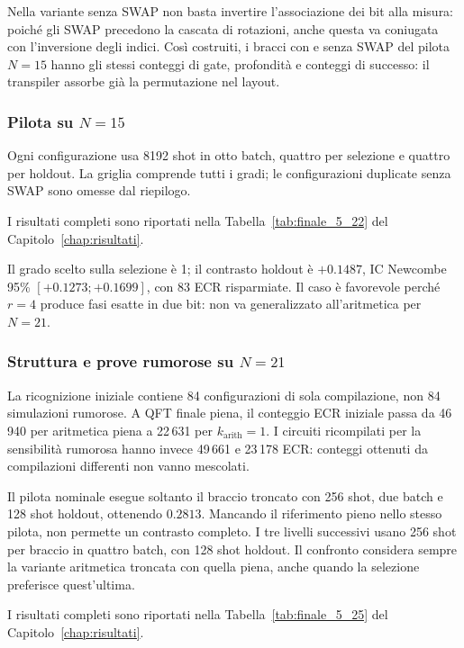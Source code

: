 \begin{onehalfspace}
Nella variante senza SWAP non basta invertire l'associazione dei bit alla
misura: poiché gli SWAP precedono la cascata di rotazioni, anche questa va
coniugata con l'inversione degli indici. Così costruiti, i bracci con e senza
SWAP del pilota $N=15$ hanno gli stessi conteggi di gate, profondità e
conteggi di successo: il transpiler assorbe già la permutazione nel layout.

\subsubsection{Pilota su \texorpdfstring{$N=15$}{N=15}}

Ogni configurazione usa 8192 shot in otto batch, quattro per selezione
e quattro per holdout. La griglia comprende tutti i gradi; le configurazioni
duplicate senza SWAP sono omesse dal riepilogo.

I risultati completi sono riportati nella Tabella~\ref{tab:finale_5_22} del Capitolo~\ref{chap:risultati}.

Il grado scelto sulla selezione è 1; il contrasto holdout è $+0.1487$,
IC Newcombe 95\% $[+0.1273;+0.1699]$, con 83 ECR risparmiate.
Il caso è favorevole perché $r=4$ produce fasi esatte in due bit:
non va generalizzato all'aritmetica per $N=21$.

\subsubsection{Struttura e prove rumorose su \texorpdfstring{$N=21$}{N=21}}

La ricognizione iniziale contiene 84 configurazioni di sola compilazione,
non 84 simulazioni rumorose. A QFT finale piena, il conteggio ECR iniziale
passa da 46\,940 per aritmetica piena a 22\,631 per
$k_{\mathrm{arith}}=1$. I circuiti ricompilati per la sensibilità
rumorosa hanno invece 49\,661 e 23\,178 ECR: conteggi ottenuti da
compilazioni differenti non vanno mescolati.

Il pilota nominale esegue soltanto il braccio troncato con 256 shot,
due batch e 128 shot holdout, ottenendo $0.2813$. Mancando il riferimento
pieno nello stesso pilota, non permette un contrasto completo.
I tre livelli successivi usano 256 shot per braccio in quattro batch,
con 128 shot holdout. Il confronto considera sempre la variante
aritmetica troncata con quella piena, anche quando la selezione
preferisce quest'ultima.

I risultati completi sono riportati nella Tabella~\ref{tab:finale_5_25} del Capitolo~\ref{chap:risultati}.


\end{onehalfspace}
